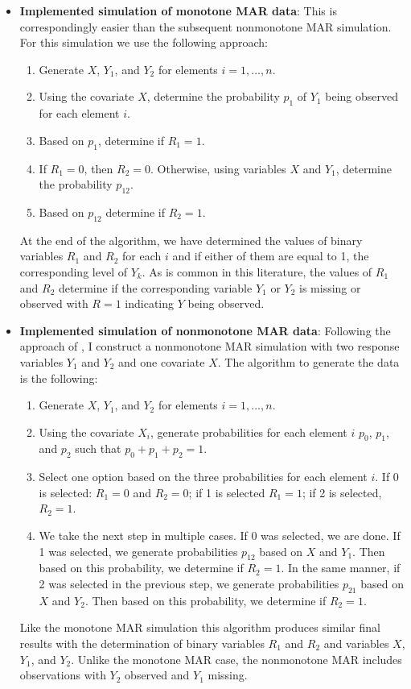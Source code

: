 \documentclass[12pt]{article}
\begin{document}
\begin{itemize}
  \item \textbf{Implemented simulation of monotone MAR data}: 
    This is correspondingly easier than the subsequent nonmonotone MAR
    simulation. For this simulation we use the following approach:
  \begin{enumerate}
      \item Generate $X$, $Y_1$, and $Y_2$ for elements $i = 1, \dots, n$.
      \item Using the covariate $X$, determine the probability $p_1$ of $Y_1$
      being observed for each element $i$.
      \item Based on $p_1$, determine if $R_1 = 1$.
      \item If $R_1 = 0$, then $R_2 = 0$. Otherwise, using variables $X$ and
        $Y_1$, determine the probability $p_{12}$.
      \item Based on $p_{12}$ determine if $R_2 = 1$.
  \end{enumerate}
    At the end of the algorithm, we have determined the values of binary
    variables $R_1$ and $R_2$ for each $i$ and if either of them are equal to 1,
    the corresponding level of $Y_{k}$. As is common in this literature, the
    values of $R_1$ and $R_2$ determine if the corresponding variable $Y_1$ or
    $Y_2$ is missing or observed with $R = 1$ indicating $Y$ being observed.
  
  \item \textbf{Implemented simulation of nonmonotone MAR data}: 
    Following the approach of \cite{robins1997non}, I construct a nonmonotone
    MAR simulation with two response variables $Y_1$ and $Y_2$ and one covariate
    $X$. The algorithm to generate the data is the following:
    \begin{enumerate}
        \item Generate $X$, $Y_1$, and $Y_2$ for elements $i = 1, \dots, n$.
        \item Using the covariate $X_i$, generate probabilities for each element
          $i$ $p_0$, $p_1$, and $p_2$ such that $p_0 + p_1 + p_2 = 1$. 
        \item Select one option based on the three probabilities for each
          element $i$. If 0 is selected: $R_1 = 0$ and $R_2 = 0$; if 1 is
          selected $R_1 = 1$; if 2 is selected, $R_2 = 1$.
        \item We take the next step in multiple cases. If 0 was selected, we are
          done. If 1 was selected, we generate probabilities $p_{12}$ based on
          $X$ and $Y_1$. Then based on this probability, we determine if $R_2 =
          1$. In the same manner, if 2 was selected in the previous step, we
          generate probabilities $p_{21}$ based on $X$ and $Y_2$. Then based on
          this probability, we determine if $R_2 = 1$.
    \end{enumerate}
    Like the monotone MAR simulation this algorithm produces similar final
    results with the determination of binary variables $R_1$ and $R_2$ and
    variables $X$, $Y_1$, and $Y_2$. Unlike the monotone MAR case, the
    nonmonotone MAR includes observations with $Y_2$ observed and $Y_1$ missing.
    

\end{itemize}
\end{document}

